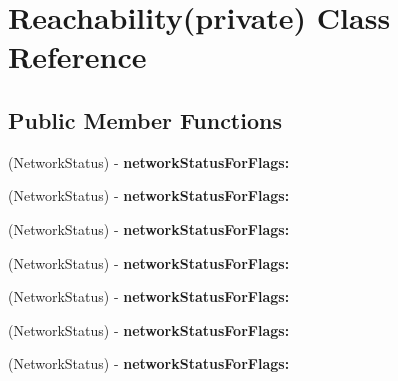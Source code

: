 \hypertarget{interface_reachability_07private_08}{
\section{\-Reachability(private) \-Class \-Reference}
\label{interface_reachability_07private_08}
}
\subsection*{\-Public \-Member \-Functions}
\begin{DoxyCompactItemize}
\item 
\hypertarget{interface_reachability_07private_08_ad50f17c5ae87abdd51ab30417466ae20}{
(\-Network\-Status) -\/ {\bfseries network\-Status\-For\-Flags\-:}}
\label{interface_reachability_07private_08_ad50f17c5ae87abdd51ab30417466ae20}

\item 
\hypertarget{interface_reachability_07private_08_ad50f17c5ae87abdd51ab30417466ae20}{
(\-Network\-Status) -\/ {\bfseries network\-Status\-For\-Flags\-:}}
\label{interface_reachability_07private_08_ad50f17c5ae87abdd51ab30417466ae20}

\item 
\hypertarget{interface_reachability_07private_08_ad50f17c5ae87abdd51ab30417466ae20}{
(\-Network\-Status) -\/ {\bfseries network\-Status\-For\-Flags\-:}}
\label{interface_reachability_07private_08_ad50f17c5ae87abdd51ab30417466ae20}

\item 
\hypertarget{interface_reachability_07private_08_ad50f17c5ae87abdd51ab30417466ae20}{
(\-Network\-Status) -\/ {\bfseries network\-Status\-For\-Flags\-:}}
\label{interface_reachability_07private_08_ad50f17c5ae87abdd51ab30417466ae20}

\item 
\hypertarget{interface_reachability_07private_08_ad50f17c5ae87abdd51ab30417466ae20}{
(\-Network\-Status) -\/ {\bfseries network\-Status\-For\-Flags\-:}}
\label{interface_reachability_07private_08_ad50f17c5ae87abdd51ab30417466ae20}

\item 
\hypertarget{interface_reachability_07private_08_ad50f17c5ae87abdd51ab30417466ae20}{
(\-Network\-Status) -\/ {\bfseries network\-Status\-For\-Flags\-:}}
\label{interface_reachability_07private_08_ad50f17c5ae87abdd51ab30417466ae20}

\item 
\hypertarget{interface_reachability_07private_08_ad50f17c5ae87abdd51ab30417466ae20}{
(\-Network\-Status) -\/ {\bfseries network\-Status\-For\-Flags\-:}}
\label{interface_reachability_07private_08_ad50f17c5ae87abdd51ab30417466ae20}


\end{DoxyCompactItemize}
